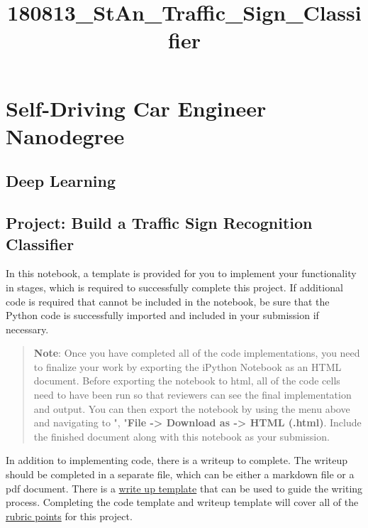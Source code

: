 \documentclass[11pt]{article}
\title{180813\_StAn\_Traffic\_Sign\_Classifier}
\begin{document}
    
    
    \maketitle
    
    

    
    \section{Self-Driving Car Engineer
Nanodegree}\label{self-driving-car-engineer-nanodegree}

\subsection{Deep Learning}\label{deep-learning}

\subsection{Project: Build a Traffic Sign Recognition
Classifier}\label{project-build-a-traffic-sign-recognition-classifier}

In this notebook, a template is provided for you to implement your
functionality in stages, which is required to successfully complete this
project. If additional code is required that cannot be included in the
notebook, be sure that the Python code is successfully imported and
included in your submission if necessary.

\begin{quote}
\textbf{Note}: Once you have completed all of the code implementations,
you need to finalize your work by exporting the iPython Notebook as an
HTML document. Before exporting the notebook to html, all of the code
cells need to have been run so that reviewers can see the final
implementation and output. You can then export the notebook by using the
menu above and navigating to \n", "\textbf{File -\textgreater{} Download
as -\textgreater{} HTML (.html)}. Include the finished document along
with this notebook as your submission.
\end{quote}

In addition to implementing code, there is a writeup to complete. The
writeup should be completed in a separate file, which can be either a
markdown file or a pdf document. There is a
\href{https://github.com/udacity/CarND-Traffic-Sign-Classifier-Project/blob/master/writeup_template.md}{write
up template} that can be used to guide the writing process. Completing
the code template and writeup template will cover all of the
\href{https://review.udacity.com/\#!/rubrics/481/view}{rubric points}
for this project.
\end{document}
